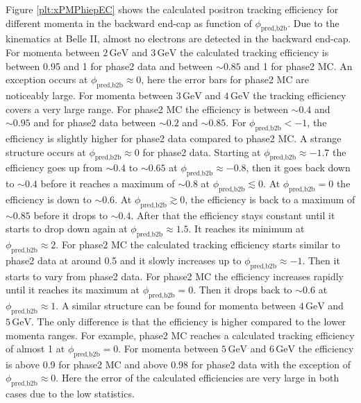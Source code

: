 \documentclass[a4paper,11pt,twosided,final,german,openbib,pdftex,listof=totoc,bibliography=totoc]{scrbook}
\begin{document}
Figure \ref{plt:xPMPhiepEC} shows the calculated positron tracking efficiency for different momenta in the backward end-cap as function of $\phi_{\textrm{pred,b2b}}$. 
Due to the kinematics at Belle II, almost no electrons are detected in the backward end-cap. 
For momenta between $2\,\textrm{GeV}$ and $3\,\textrm{GeV}$ the calculated tracking efficiency is between 0.95 and 1 for phase2 data and between $\sim 0.85$ and 1 for phase2 MC. An exception occurs at $\phi_{\textrm{pred,b2b}} \approx 0$, here the error bars for phase2 MC are noticeably large. 
For momenta between $3\,\textrm{GeV}$ and $4\,\textrm{GeV}$ the tracking efficiency covers a very large range. For phase2 MC the efficiency is between $\sim 0.4$ and $\sim 0.95$ and for phase2 data between $\sim 0.2$ and $ \sim 0.85$. For $\phi_{\textrm{pred,b2b}} < -1$, the efficiency is slightly higher for phase2 data compared to phase2 MC. 
A strange structure occurs at $\phi_{\textrm{pred,b2b}} \approx 0$ for phase2 data. Starting at  $\phi_{\textrm{pred,b2b}} \approx -1.7$ the efficiency goes up from $\sim 0.4$ to $\sim 0.65$ at $\phi_{\textrm{pred,b2b}} \approx -0.8$, then it goes back down to $\sim 0.4$ before it reaches a maximum of $\sim 0.8$ at $\phi_{\textrm{pred,b2b}} \lesssim 0$.
At $\phi_{\textrm{pred,b2b}} =0$ the efficiency is down to $\sim 0.6$. At $\phi_{\textrm{pred,b2b}} \gtrsim 0$, the efficiency is back to a maximum of $\sim 0.85$ before it drops to $\sim 0.4$.
After that the efficiency stays constant until it starts to drop down again at $\phi_{\textrm{pred,b2b}} \approx 1.5$. It reaches its minimum at $\phi_{\textrm{pred,b2b}} \approx 2$.
For phase2 MC the calculated tracking efficiency starts similar to phase2 data at around 0.5 and it slowly increases up to $\phi_{\textrm{pred,b2b}} \approx -1$. Then it starts to vary from phase2 data. For phase2 MC the efficiency  increases rapidly until it reaches its maximum at $\phi_{\textrm{pred,b2b}} = 0$. Then it drops back to $\sim 0.6$ at $\phi_{\textrm{pred,b2b}} \approx 1$.
A similar structure can be found for momenta between $4\,\textrm{GeV}$ and $5\,\textrm{GeV}$. The only difference is that the efficiency is higher compared to the lower momenta ranges. For example, phase2 MC reaches a calculated tracking efficiency of almost 1 at $\phi_{\textrm{pred,b2b}} =0$.
For momenta between $5\,\textrm{GeV}$ and $6\,\textrm{GeV}$ the efficiency is above 0.9 for  phase2 MC and above 0.98 for phase2 data with the exception of $\phi_{\textrm{pred,b2b}} \approx 0$. Here the error of the calculated efficiencies are very large in both cases due to the low statistics.
\end{document}
